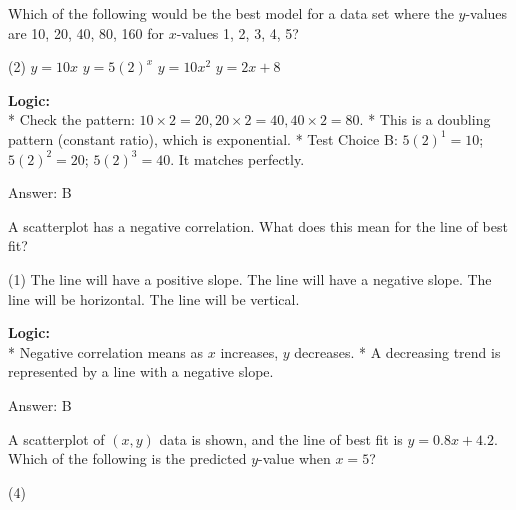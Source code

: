 \documentclass[11pt,paper=a4,answers]{exam}
\begin{document}
\begin{questions}
\question
Which of the following would be the best model for a data set where the $y$-values are 10, 20, 40, 80, 160 for $x$-values 1, 2, 3, 4, 5?
\begin{tasks}(2)
    \task $y = 10x$
    \task $y = 5(2)^x$
    \task $y = 10x^2$
    \task $y = 2x + 8$
\end{tasks}

\begin{solution}
\textbf{Logic:} \\
* Check the pattern: $10 \times 2 = 20, 20 \times 2 = 40, 40 \times 2 = 80$.
* This is a doubling pattern (constant ratio), which is exponential.
* Test Choice B: $5(2)^1 = 10$; $5(2)^2 = 20$; $5(2)^3 = 40$. It matches perfectly.

\vspace{30pt}

Answer: \colorbox{yellow!100}{B}
\end{solution}

\vspace{60pt}

\question
A scatterplot has a negative correlation. What does this mean for the line of best fit?
\begin{tasks}(1)
    \task The line will have a positive slope.
    \task The line will have a negative slope.
    \task The line will be horizontal.
    \task The line will be vertical.
\end{tasks}

\begin{solution}
\textbf{Logic:} \\
* Negative correlation means as $x$ increases, $y$ decreases.
* A decreasing trend is represented by a line with a negative slope.

\vspace{30pt}

Answer: \colorbox{yellow!100}{B}
\end{solution}

\question
A scatterplot of $(x, y)$ data is shown, and the line of best fit is $y = 0.8x + 4.2$. Which of the following is the predicted $y$-value when $x = 5$?
\begin{tasks}(4)
\end{tasks}


\end{questions}
\end{document}
